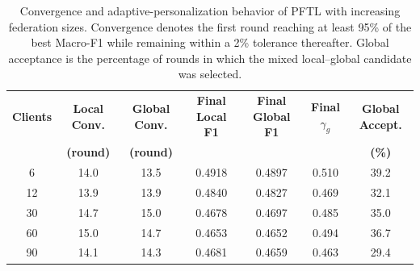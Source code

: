 \begin{table}[!t]
\centering
\small
\caption{Convergence and adaptive-personalization behavior of PFTL with increasing federation sizes. Convergence denotes the first round reaching at least 95\% of the best Macro-F1 while remaining within a 2\% tolerance thereafter. Global acceptance is the percentage of rounds in which the mixed local--global candidate was selected.}
\label{tab:convergence_scalability}
\setlength{\tabcolsep}{4pt}
\begin{tabular}{ccccccc}
\toprule
\textbf{Clients}
& \textbf{Local Conv.}
& \textbf{Global Conv.}
& \textbf{Final Local F1}
& \textbf{Final Global F1}
& \textbf{Final $\gamma_g$}
& \textbf{Global Accept.} \\

& \textbf{(round)}
& \textbf{(round)}
&
&
&
& \textbf{(\%)} \\
\midrule
6 & 14.0 & 13.5 & 0.4918 & 0.4897 & 0.510 & 39.2 \\
12 & 13.9 & 13.9 & 0.4840 & 0.4827 & 0.469 & 32.1 \\
30 & 14.7 & 15.0 & 0.4678 & 0.4697 & 0.485 & 35.0 \\
60 & 15.0 & 14.7 & 0.4653 & 0.4652 & 0.494 & 36.7 \\
90 & 14.1 & 14.3 & 0.4681 & 0.4659 & 0.463 & 29.4 \\
\bottomrule
\end{tabular}
\end{table}
